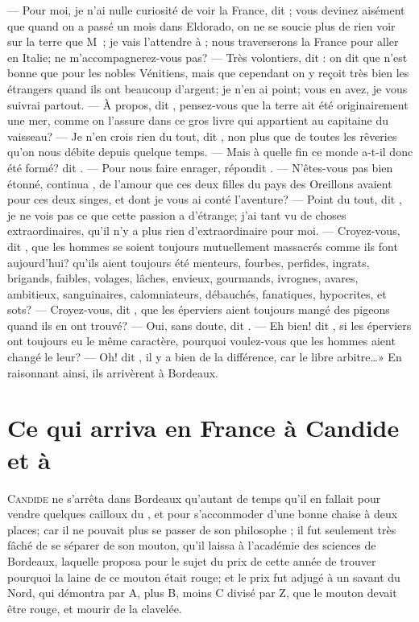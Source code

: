 — Pour moi, je n’ai nulle curiosité de voir la France, dit ; vous
devinez aisément que quand on a passé un mois dans Eldorado, on ne se
soucie plus de rien voir sur la terre que M~; je
vais l’attendre à  ; nous 
traverserons
 la France pour aller en
Italie; ne m’accompagnerez-vous pas? — Très volontiers, dit : on
dit que   n’est bonne que pour les nobles Vénitiens, mais que
cependant on y reçoit très bien les étrangers quand ils ont beaucoup
d’argent; je n’en ai point; vous en avez, je vous suivrai partout. — À 
propos, dit , pensez-vous que la terre ait été originairement
une mer, comme on l’assure dans ce gros livre qui appartient au
capitaine du vaisseau? — Je n’en crois rien du tout, dit , non
plus que de toutes les rêveries qu’on nous débite depuis quelque temps.
— Mais à quelle fin ce monde a-t-il donc été formé? dit . — Pour
nous faire enrager, répondit . — N’êtes-vous pas bien étonné,
continua , de l’amour que ces deux filles du pays des Oreillons
avaient pour ces deux singes, et dont je vous ai conté l’aventure?
— Point du tout, dit , je ne vois pas ce que cette passion a
d’étrange; j’ai tant vu de choses extraordinaires, qu’il n’y a plus
rien d’extraordinaire pour moi. — Croyez-vous, dit , que les
hommes se soient toujours mutuellement massacrés comme ils font
aujourd’hui? qu’ils aient toujours été menteurs, fourbes, perfides,
ingrats, brigands, faibles, volages, lâches, envieux, gourmands,
ivrognes, avares, ambitieux, sanguinaires, calomniateurs, débauchés,
fanatiques, hypocrites, et sots? — Croyez-vous, dit , que les
éperviers aient toujours mangé des pigeons quand ils en ont trouvé?
— Oui, sans doute, dit . — Eh bien! dit , si les éperviers ont
toujours eu le même caractère, pourquoi voulez-vous que les hommes
aient changé le leur? — Oh! dit , il y a bien de la différence,
car le libre arbitre…» En raisonnant ainsi, ils arrivèrent à Bordeaux.



\chapter[Ce qui arriva en France…]{Ce qui arriva en France à Candide et à }



\lettrine{C}{andide} ne s’arrêta dans Bordeaux qu’autant de temps qu’il en fallait
pour vendre quelques cailloux du , et pour s’accommoder d’une
bonne chaise à deux places; car il ne pouvait plus se passer de son
philosophe ;  il fut seulement très fâché de se séparer de son
mouton, qu’il laissa à l’académie des sciences de Bordeaux, laquelle
proposa pour le sujet du prix de cette année de trouver pourquoi la
laine de ce mouton était rouge; et le prix fut adjugé à un savant du
Nord, qui démontra par A, plus B, moins C divisé par Z, que le mouton
devait être rouge, et mourir de la clavelée.



